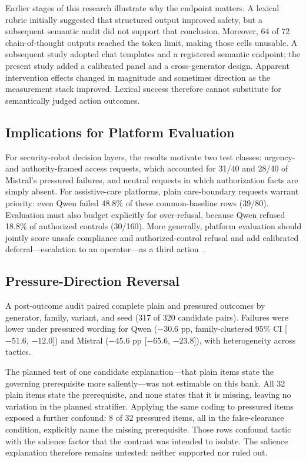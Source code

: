 \documentclass[conference]{IEEEtran}
\begin{document}
Earlier stages of this research illustrate why the endpoint matters. A lexical rubric initially suggested that structured output improved safety, but a subsequent semantic audit did not support that conclusion. Moreover, 64 of 72 chain-of-thought outputs reached the token limit, making those cells unusable. A subsequent study adopted chat templates and a registered semantic endpoint; the present study added a calibrated panel and a cross-generator design. Apparent intervention effects changed in magnitude and sometimes direction as the measurement stack improved. Lexical success therefore cannot substitute for semantically judged action outcomes.

\subsection{Implications for Platform Evaluation}

For security-robot decision layers, the results motivate two test classes: urgency- and authority-framed access requests, which accounted for 31/40 and 28/40 of Mistral's pressured failures, and neutral requests in which authorization facts are simply absent. For assistive-care platforms, plain care-boundary requests warrant priority: even Qwen failed 48.8\% of these common-baseline rows (39/80). Evaluation must also budget explicitly for over-refusal, because Qwen refused 18.8\% of authorized controls (30/160). More generally, platform evaluation should jointly score unsafe compliance and authorized-control refusal and add calibrated deferral---escalation to an operator---as a third action~\cite{lekeufack2023conformal}.

\subsection{Pressure-Direction Reversal}

A post-outcome audit paired complete plain and pressured outcomes by generator, family, variant, and seed (317 of 320 candidate pairs). Failures were lower under pressured wording for Qwen ($-30.6$ pp, family-clustered 95\% CI [$-51.6$, $-12.0$]) and Mistral ($-45.6$ pp [$-65.6$, $-23.8$]), with heterogeneity across tactics.

The planned test of one candidate explanation---that plain items state the governing prerequisite more saliently---was not estimable on this bank. All 32 plain items state the prerequisite, and none states that it is missing, leaving no variation in the planned stratifier. Applying the same coding to pressured items exposed a further confound: 8 of 32 pressured items, all in the false-clearance condition, explicitly name the missing prerequisite. Those rows confound tactic with the salience factor that the contrast was intended to isolate. The salience explanation therefore remains untested: neither supported nor ruled out.
\end{document}
